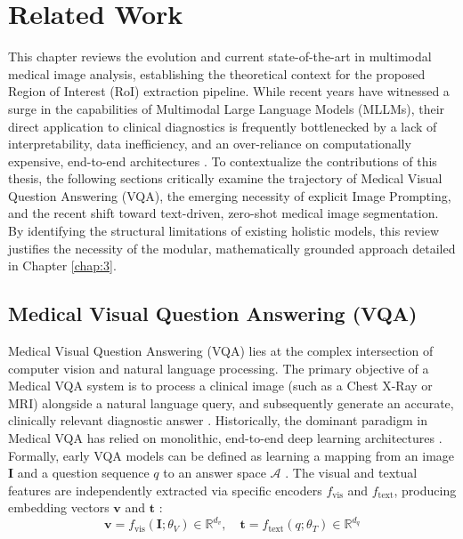 \chapter{Related Work}
This chapter reviews the evolution and current state-of-the-art in multimodal medical image analysis, establishing the theoretical context for the proposed Region of Interest (RoI) extraction pipeline. While recent years have witnessed a surge in the capabilities of Multimodal Large Language Models (MLLMs), their direct application to clinical diagnostics is frequently bottlenecked by a lack of interpretability, data inefficiency, and an over-reliance on computationally expensive, end-to-end architectures \cite{arxiv-mllms-medicine, arxiv-tinyllavamed}. To contextualize the contributions of this thesis, the following sections critically examine the trajectory of Medical Visual Question Answering (VQA), the emerging necessity of explicit Image Prompting, and the recent shift toward text-driven, zero-shot medical image segmentation. By identifying the structural limitations of existing holistic models, this review justifies the necessity of the modular, mathematically grounded approach detailed in Chapter \ref{chap:3}.

\section{Medical Visual Question Answering (VQA)}

Medical Visual Question Answering (VQA) lies at the complex intersection of computer vision and natural language processing. The primary objective of a Medical VQA system is to process a clinical image (such as a Chest X-Ray or MRI) alongside a natural language query, and subsequently generate an accurate, clinically relevant diagnostic answer \cite{arxiv-medvqa-review}.
Historically, the dominant paradigm in Medical VQA has relied on monolithic, end-to-end deep learning architectures \cite{arxiv-medvqa-review}. Formally, early VQA models can be defined as learning a mapping from an image $\mathbf{I}$ and a question sequence $q$ to an answer space $\mathcal{A}$ \cite{antol2015vqa}. The visual and textual features are independently extracted via specific encoders $f_{\text{vis}}$ and $f_{\text{text}}$, producing embedding vectors $\mathbf{v}$ and $\mathbf{t}$ \cite{benyounes2017mutan}:
\begin{equation}
\mathbf{v} = f_{\text{vis}}(\mathbf{I}; \theta_V) \in \mathbb{R}^{d_v}, \quad \mathbf{t} = f_{\text{text}}(q; \theta_T) \in \mathbb{R}^{d_q}
\end{equation}

